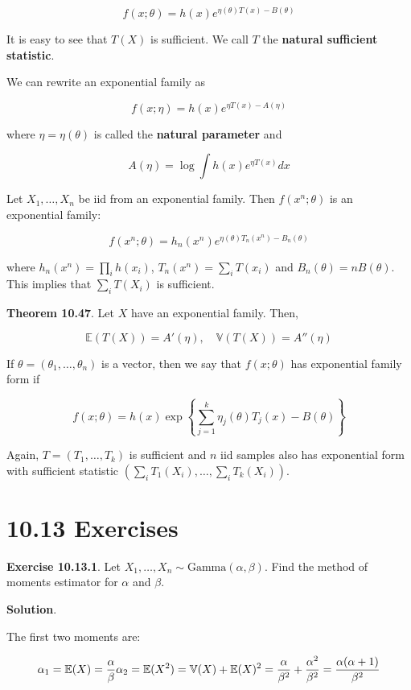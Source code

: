 \[f(x; \theta) = h(x) e^{\eta(\theta)T(x) - B(\theta)}\]

It is easy to see that \(T(X)\) is sufficient. We call \(T\) the
\textbf{natural sufficient statistic}.

We can rewrite an exponential family as

\[f(x; \eta) = h(x) e^{\eta T(x) - A(\eta)}\]

where \(\eta = \eta(\theta)\) is called the \textbf{natural parameter}
and

\[A(\eta) = \log \int h(x) e^{\eta T(x)} dx\]

Let \(X_{1}, \dots, X_{n}\) be iid from an exponential family. Then
\(f(x^{n}; \theta)\) is an exponential family:

\[f(x^{n}; \theta) = h_{n}(x^{n}) e^{\eta(\theta) T_{n}(x^{n}) - B_{n}(\theta)}\]

where \(h_{n}(x^{n}) = \prod_{i} h(x_{i})\), \(T_{n}(x^{n}) = \sum_{i} T(x_{i})\) and
\(B_{n}(\theta) = nB(\theta)\). This implies that \(\sum_{i} T(X_{i})\) is
sufficient.

\textbf{Theorem 10.47}. Let \(X\) have an exponential family. Then,

\[
\mathbb{E}(T(X)) = A'(\eta),
\quad
\mathbb{V}(T(X)) = A''(\eta)
\]

If \(\theta = (\theta_{1}, \dots, \theta_{n})\) is a vector, then we say
that \(f(x; \theta)\) has exponential family form if

\[ f(x; \theta) = h(x) \exp \left\{ \sum_{j=1}^{k} \eta_{j}(\theta) T_{j}(x) - B(\theta) \right\}\]

Again, \(T = (T_{1}, \dots, T_{k})\) is sufficient and \(n\) iid samples
also has exponential form with sufficient statistic
\(\left(\sum_{i} T_{1}(X_{i}), \dots, \sum_{i} T_{k}(X_{i})\right)\).

\section*{10.13 Exercises}

\textbf{Exercise 10.13.1}. Let
\(X_{1}, \dots, X_{n} \sim \text{Gamma}(\alpha, \beta)\). Find the method of
moments estimator for \(\alpha\) and \(\beta\).

\textbf{Solution}.

The first two moments are:

\[
\alpha_{1} = \mathbb{E}(X) = \frac{\alpha}{\beta}\\
\alpha_{2} = \mathbb{E}(X^{2}) = \mathbb{V}(X) + \mathbb{E}(X)^{2} = \frac{\alpha}{\beta^{2}} + \frac{\alpha^{2}}{\beta^{2}} = \frac{\alpha(\alpha + 1)}{\beta^{2}} 
\]

